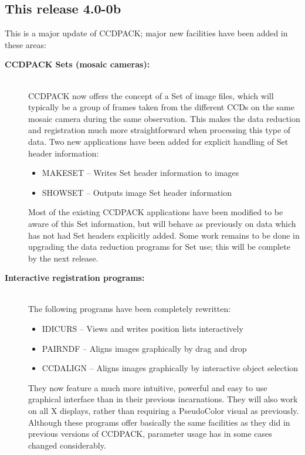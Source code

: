 \documentclass[twoside,11pt]{article}
\newcommand{\htmlref}[2]{#1}
\renewcommand{\_}{\texttt{\symbol{95}}}
\newcommand{\xroutine}[1]{\htmlref{{\sc #1}}{#1}}
\begin{document}
\subsection{This release 4.0-0b}

  This is a major update of CCDPACK; major new facilities have been
  added in these areas:

  \begin{description}
  \item[{\bf CCDPACK Sets (mosaic cameras):}]\mbox{}\\
     CCDPACK now offers the concept of a Set of image files, which will
     typically be a group of frames taken from the different CCDs on the
     same mosaic camera during the same observation.  This makes the
     data reduction and registration much more straightforward when
     processing this type of data.  Two new applications have been
     added for explicit handling of Set header information:
     \begin{itemize}
     \item \xroutine{MAKESET} -- Writes Set header information to images
     \item \xroutine{SHOWSET} -- Outputs image Set header information
     \end{itemize}
     Most of the existing CCDPACK applications have been modified to
     be aware of this Set information, but will behave as previously
     on data which has not had Set headers explicitly added.
     Some work remains to be done in upgrading the data reduction
     programs for Set use; this will be complete by the next release.

  \item[{\bf Interactive registration programs:}]\mbox{}\\
     The following programs have been completely rewritten:
     \begin{itemize}
     \item \xroutine{IDICURS} -- 
           Views and writes position lists interactively
     \item \xroutine{PAIRNDF} -- 
           Aligns images graphically by drag and drop
     \item \xroutine{CCDALIGN} -- 
           Aligns images graphically by interactive object selection
     \end{itemize}
     They now feature a much more intuitive, powerful and easy to use
     graphical interface than in their previous incarnations.  They
     will also work on all X displays, rather than requiring a
     PseudoColor visual as previously.  Although these programs offer
     basically the same facilities as they did in previous versions of
     CCDPACK, parameter usage has in some cases changed considerably.


\end{description}
\end{document}
